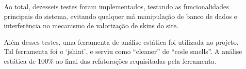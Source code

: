 Ao total, dezesseis testes foram implementados, testando as funcionalidades principais do sistema, 
evitando qualquer má manipulação de banco de dados e interferência no mecanismo de valorização de
skins do site.

Além desses testes, uma ferramenta de análise estática foi utilizada no projeto. Tal ferramenta 
foi o ‘jshint’, e serviu como “cleaner” de “code smells”. A análise estática de 100\% ao final 
das refatorações requisitadas pela ferramenta.

















